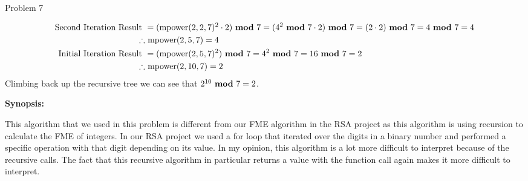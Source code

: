 \begin{problem}{Problem 7}
\begin{Highlight}[Solution - \#6]
\begin{enumerate}[label = \arabic*., start = 6]
{\begin{align*}
                    \text{Second Iteration Result } & = (\text{mpower}(2,2,7)^{2} \cdot 2) \text{ \textbf{mod} } 7 = (4^{2} \text{ \textbf{mod} } 7 \cdot 2) \text{ \textbf{mod} } 7 = (2 \cdot 2) \text{ \textbf{mod} } 7 = 4 \text{ \textbf{mod} } 7 = 4 \\
                    \therefore & \text{ mpower}(2,5,7) = 4 \\
                    \text{Initial Iteration Result } & = (\text{mpower}(2,5,7)^{2}) \text{ \textbf{mod} } 7 = 4^{2} \text{ \textbf{mod} } 7 = 16 \text{ \textbf{mod} } 7 = 2 \\
                    \therefore & \text{ mpower}(2,10,7) = 2
                \end{align*}
            }
            \normalsize
            Climbing back up the recursive tree we can see that $2^{10} \text{ \textbf{mod} } 7 = 2$.            
        \end{enumerate}
        
        \textbf{Synopsis:} \vspace*{1em}

        This algorithm that we used in this problem is different from our FME algorithm in the RSA project as this algorithm is using recursion to calculate the FME of integers. In our RSA project
        we used a for loop that iterated over the digits in a binary number and performed a specific operation with that digit depending on its value. In my opinion, this algorithm is a lot more
        difficult to interpret because of the recursive calls. The fact that this recursive algorithm in particular returns a value with the function call again makes it more difficult to interpret.
    \end{Highlight}
\end{problem}

